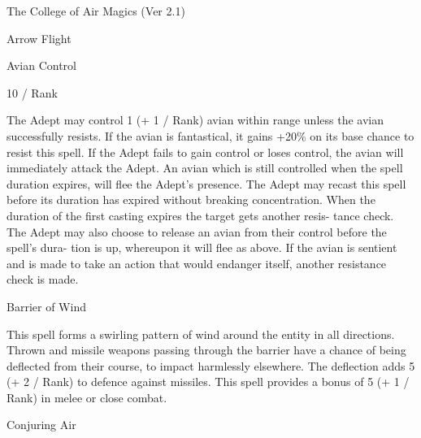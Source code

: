 \begin{Chapter}{The College of Air Magics (Ver 2.1)}
\begin{spell}[S-2]{Arrow Flight }
\begin{effects}
\end{effects}
\end{spell}

\begin{spell}[S-3]{Avian Control }

10 / Rank 
\begin{effects}
 The  Adept  may  control  1  (+  1  /  Rank) 
avian  within  range  unless  the  avian  successfully 
resists. If the avian is fantastical, it gains +20\% on 
its base chance to resist this spell. If the Adept fails 
to  gain  control  or  loses  control,  the  avian  will 
immediately  attack  the  Adept.  An  avian  which  is 
still controlled when the spell duration expires, will 
flee  the  Adept’s  presence.  The  Adept  may  recast 
this  spell  before  its  duration  has  expired  without 
breaking  concentration.  When  the  duration  of  the 
first  casting  expires  the  target  gets  another  resis-
tance check. The Adept may also choose to release 
an avian from their control before the spell’s dura-
tion  is  up,  whereupon  it  will  flee  as  above.  If  the 
avian is sentient and is made to take an action that 
would  endanger  itself,  another  resistance  check  is 
made. 

\end{effects}
\end{spell}

\begin{spell}[S-4]{Barrier of Wind }

\begin{effects}
This spell forms a swirling pattern of wind 
around  the  entity  in  all  directions.  Thrown  and 
missile weapons passing through the barrier have a 
chance  of  being  deflected  from  their  course,  to 
impact  harmlessly  elsewhere.  The  deflection  adds 
5  (+  2  /  Rank)  to  defence  against  missiles.  This 
spell provides a bonus of 5 (+ 1 / Rank) in melee or 
close combat. 

\end{effects}
\end{spell}

\begin{spell}[S-5]{Conjuring Air }


\end{spell}
\end{Chapter}
